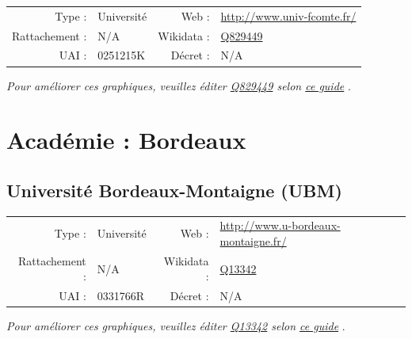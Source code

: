 \documentclass[12pt,french,landscape]{article}
\begin{document}
\begin{tabular*}{0.45\textwidth}{rp{2cm}rl}  
\hline  
Type : & Université & Web : &\href{http://www.univ-fcomte.fr/}{http://www.univ-fcomte.fr/} \\  
Rattachement : & N/A & Wikidata : & \href{https://www.wikidata.org/entity/Q829449}{Q829449} \\  
UAI : & 0251215K & Décret : & N/A \\  
\hline  
\end{tabular*}

\textit{\scriptsize Pour améliorer ces graphiques, veuillez éditer \href{https://www.wikidata.org/entity/Q829449}{Q829449}  selon \href{https://github.com/cpesr/wikidataESR/blob/master/Rmd/wikidataESR.md}{ce guide}}
.


\newpage

\hypertarget{acaduxe9mie-bordeaux}{%
\section{Académie : Bordeaux}\label{acaduxe9mie-bordeaux}}

\hypertarget{universituxe9-bordeaux-montaigne-ubm}{%
\subsection{Université Bordeaux-Montaigne
(UBM)}\label{universituxe9-bordeaux-montaigne-ubm}}

\begin{tabular*}{0.45\textwidth}{rp{2cm}rl}  
\hline  
Type : & Université & Web : &\href{http://www.u-bordeaux-montaigne.fr/}{http://www.u-bordeaux-montaigne.fr/} \\  
Rattachement : & N/A & Wikidata : & \href{https://www.wikidata.org/entity/Q13342}{Q13342} \\  
UAI : & 0331766R & Décret : & N/A \\  
\hline  
\end{tabular*}

\textit{\scriptsize Pour améliorer ces graphiques, veuillez éditer \href{https://www.wikidata.org/entity/Q13342}{Q13342}  selon \href{https://github.com/cpesr/wikidataESR/blob/master/Rmd/wikidataESR.md}{ce guide}}
.

\end{document}
